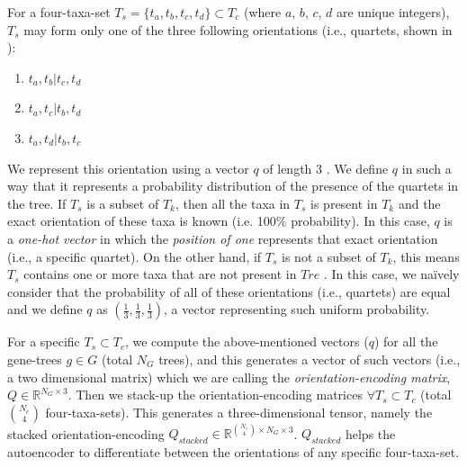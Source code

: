 For a four-taxa-set $T_s = \{t_a,t_b,t_c,t_d\} \subset T_c$  (where $a$, $b$, $c$, $d$ are unique integers), $T_s$ may form only one of the three following orientations (i.e., quartets, shown in ): 
\begin{enumerate}
    \item $t_a, t_b | t_c, t_d$
    \item $t_a, t_c | t_b, t_d$
    \item $t_a, t_d | t_b, t_c$
\end{enumerate}
We represent this orientation using a vector $q$ of length $3$
. We define $q$ in such a way that it represents a probability distribution of the presence of the quartets in the tree. 
If $T_s$ is a subset of $T_k$, then all the taxa in $T_s$ is present in $T_k$ and the exact orientation of these taxa is known (i.e. 100\% probability). In this case, $q$ is a \textit{one-hot vector}\SR{[cite]} in which the \textit{position of one} represents that exact orientation (i.e., a specific quartet). On the other hand, if $T_s$ is not a subset of $T_k$, this means $T_s$ contains one or more taxa that are not present in $Tre$ . In this case, we na\"ively consider that the probability of all of these orientations (i.e., quartets) are equal and we define $q$ as $(\frac{1}{3}, \frac{1}{3}, \frac{1}{3})$, a vector representing such uniform probability. 

For a specific $T_s \subset T_c$, we compute the above-mentioned vectors ($q$) for all the gene-trees $g \in G$ (total $N_G$ trees), and this generates a vector of such vectors (i.e., a two dimensional matrix) which we are calling the\textit{ orientation-encoding matrix}, $Q \in \mathbb{R}^{N_G \times 3}$. Then we stack-up the orientation-encoding matrices $\forall T_s \subset T_c$ (total $\binom{N_c}{4}$ four-taxa-sets). This generates a three-dimensional tensor, namely the stacked orientation-encoding $Q_{stacked} \in \mathbb{R}^{\binom{N_c}{4} \times N_G \times 3}$. $Q_{stacked}$ helps the autoencoder to differentiate between the orientations of any specific four-taxa-set.

